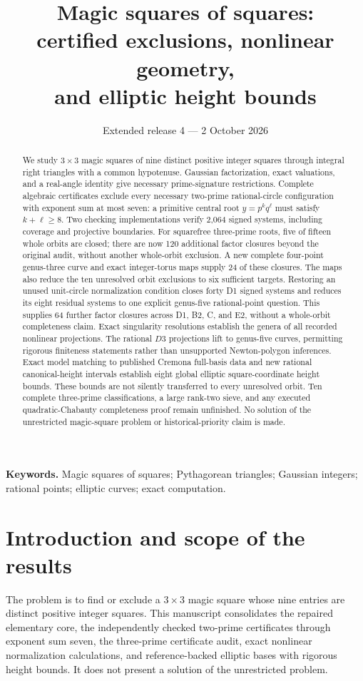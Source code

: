 \documentclass[11pt,letterpaper]{article}
\title{Magic squares of squares:\\certified exclusions, nonlinear geometry,\\and elliptic height bounds}
\author{}
\date{Extended release 4 --- 2 October 2026}
\theoremstyle{definition}\newtheorem{definition}[theorem]{Definition}
\theoremstyle{remark}\newtheorem{remark}[theorem]{Remark}
\begin{document}
\maketitle
\begin{abstract}
We study $3\times3$ magic squares of nine distinct positive integer squares through integral right triangles with a common hypotenuse. Gaussian factorization, exact valuations, and a real-angle identity give necessary prime-signature restrictions. Complete algebraic certificates exclude every necessary two-prime rational-circle configuration with exponent sum at most seven: a primitive central root $y=p^kq^\ell$ must satisfy $k+\ell\ge8$. Two checking implementations verify 2,064 signed systems, including coverage and projective boundaries. For squarefree three-prime roots, five of fifteen whole orbits are closed; there are now 120 additional factor closures beyond the original audit, without another whole-orbit exclusion. A new complete four-point genus-three curve and exact integer-torus maps supply 24 of these closures. The maps also reduce the ten unresolved orbit exclusions to six sufficient targets. Restoring an unused unit-circle normalization condition closes forty D1 signed systems and reduces its eight residual systems to one explicit genus-five rational-point question. This supplies 64 further factor closures across D1, B2, C, and E2, without a whole-orbit completeness claim. Exact singularity resolutions establish the genera of all recorded nonlinear projections. The rational $D3$ projections lift to genus-five curves, permitting rigorous finiteness statements rather than unsupported Newton-polygon inferences. Exact model matching to published Cremona full-basis data and new rational canonical-height intervals establish eight global elliptic square-coordinate height bounds. These bounds are not silently transferred to every unresolved orbit. Ten complete three-prime classifications, a large rank-two sieve, and any executed quadratic-Chabauty completeness proof remain unfinished. No solution of the unrestricted magic-square problem or historical-priority claim is made.
\end{abstract}
\medskip
\noindent\textbf{Keywords.} Magic squares of squares; Pythagorean triangles; Gaussian integers; rational points; elliptic curves; exact computation.
\clearpage
\tableofcontents
\clearpage
\section{Introduction and scope of the results}\label{sec:introduction}
The problem is to find or exclude a $3\times3$ magic square whose nine entries are distinct positive integer squares. This manuscript consolidates the repaired elementary core, the independently checked two-prime certificates through exponent sum seven, the three-prime certificate audit, exact nonlinear normalization calculations, and reference-backed elliptic bases with rigorous height bounds. It does not present a solution of the unrestricted problem.
\end{document}
